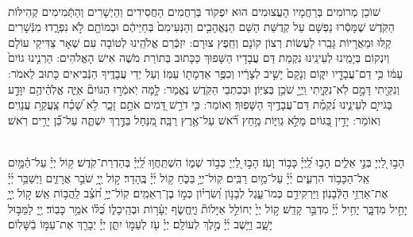 \documentclass[twoside, openany, parskip=half, 11pt]{book}
\begin{document}
\begin{sometimes}

\\
 שׁוֹכֵן מְרוֹמִים בְּרַחֲמָיו הָעֲצוּמִים הוּא יִפְקוֹד בְּרַחֲמִים הַחֲסִידִים וְהַיְשָׁרִים וְהַתְּֿמִימִים קְהִילּוֹת הַקֹּֽדֶשׁ שֶׁמָּסְֿרוּ נַפְשָׁם עַל קְדֻשַּׁת הַשֵּׁם הַנֶּאֱהָבִ֤ים וְהַנְּעִימִם֙ בְּחַיֵּיהֶ֔ם וּבְמוֹתָ֖ם לֹ֣א נִפְרָ֑דוּ׃ מִנְּֿשָׁרִים קַֽלּוּ וּמֵאֲרָיוֹת גָּבֵֽרוּ לַעֲשׂוֹת רְצוֹן קוֹנָם וְחֵֽפֶץ צוּרָם: יִזְכְּֿרֵם אֱלֹהֵֽינוּ לְטוֹבָה עִם שְׁאָר צַדִּיקֵי עוֹלָם וְיִנְקוֹם בְּיָמֵֽינוּ לְעֵינֵֽינוּ נִקְמַת דַּם עֲבָדָיו הַשָּׁפוּךְ כַּכָּתוּב בְּתוֹרַת מֹשֶׁה אִישׁ הָאֱלֹהִים: הַרְנִ֤ינוּ גוֹיִם֙ עַמּ֔וֹ כִּ֥י דַם־עֲבָדָ֖יו יִקּ֑וֹם וְנָקָם֙ יָשִׁ֣יב לְצָרָ֔יו וְכִפֶּ֥ר אַדְמָת֖וֹ עַמּֽוֹ׃ וְעַל יְדֵי עֲבָדֶֽיךָ הַנְּֿבִיאִים כָּתוּב לֵאמֹר: וְנִקֵּ֖יתִי דָּמָ֣ם לֹֽא־נִקֵּ֑יתִי וַֽיְיָ֖ שֹׁכֵ֥ן בְּצִיּֽוֹן׃ וּבְכִתְבֵי הַקֹּֽדֶשׁ נֶאֱמַר: לָ֤מָּה יֹֽאמְֿר֣וּ הַגּוֹיִם֘ אַיֵּ֢ה אֱלֹֽהֵ֫יהֶ֥ם יִוָּדַ֣ע בַּגֹּייִ֣ם לְעֵינֵ֑ינוּ נִ֝קְמַ֗ת דַּם־עֲבָדֶ֥יךָ הַשָּׁפֽוּךְ׃ וְאוֹמֵר: כִּ֤י דֹרֵ֣שׁ דָּ֭מִים אֹתָ֣ם זָכָ֑ר לֹ֥א שָׁ֝כַ֗ח צַֽעֲקַ֥ת עֲנָוִֽים׃ וְאוֹמֵר: יָדִ֣ין בַּ֭גּוֹיִם מָלֵ֣א גְוִיּ֑וֹת מָ֥חַץ רֹ֝֗אשׁ עַל־אֶ֥רֶץ רַבָּֽה׃ מִ֭נַּחַל בַּדֶּ֣רֶךְ יִשְׁתֶּ֑ה עַל־כֵּ֝֗ן יָרִ֥ים רֹֽאשׁ׃

\end{sometimes}


\yehalelu

\\
%
הָב֣וּ לַ֭יְיָ בְּנֵ֣י אֵלִ֑ים הָב֥וּ לַֽ֝יְיָ֗ כָּב֥וֹד וָעֹֽז׃ 
הָב֣וּ לַ֭יְיָ כְּב֣וֹד שְׁמ֑וֹ הִשְׁתַּֽחֲו֥וּ לַֽ֝יְיָ֗ בְּהַדְרַת־קֹֽדֶשׁ׃ 
ק֥וֹל יְיָ֗ עַל־הַ֫מָּ֥יִם אֵֽל־הַכָּב֥וֹד הִרְעִ֑ים יְ֜יָ֗ עַל־מַ֥יִם רַבִּֽים׃ 
קֽוֹל־יְיָ֥ בַּכֹּ֑חַ ק֥וֹל יְ֜יָ֗ בֶּֽהָדָר׃ 
ק֣וֹל יְ֖יָ֥ שֹׁבֵ֣ר אֲרָזִ֑ים וַיְשַׁבֵּ֥ר יְ֜יָ֗ אֶת־אַרְזֵ֥י הַלְּֿבָנֽוֹן׃ 
וַיַּרְקִידֵ֥ם כְּמוֹ־עֵ֑גֶל לְבָנ֥וֹן וְ֝שִׂרְי֗וֹן כְּמ֣וֹ בֶן־רְאֵמִֽים׃ 
קֽוֹל־יְיָ֥ חֹ֝צֵ֗ב לַֽהֲב֥וֹת אֵֽשׁ׃ 
ק֣וֹל יְ֖יָ֥ יָחִ֣יל מִדְבָּ֑ר יָחִ֥יל יְ֜יָ֗ מִדְבַּ֣ר קָדֵֽשׁ׃ 
ק֣וֹל יְיָ֙ יְחוֹלֵ֣ל אַיָּלוֹת֘ וַיֶּֽחֱשׂ֢ף יְעָ֫ר֥וֹת וּבְהֵֽיכָל֑וֹ כֻּ֝לּ֗וֹ אֹמֵ֥ר כָּבֽוֹד׃ 
יְ֖יָ לַמַּבּ֣וּל יָשָׁ֑ב וַיֵּ֥שֶׁב יְ֜יָ֗ מֶ֣לֶךְ לְעוֹלָֽם׃ 
יְיָ֗ עֹ֖ז לְעַמּ֣וֹ יִתֵּ֑ן יְיָ֓ יְבָרֵ֖ךְ אֶת־עַמּ֣וֹ בַֿשָּׁלֽוֹם׃
\end{document}
